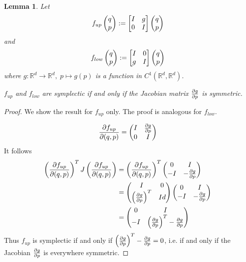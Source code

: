 \documentclass[twoside,a4paper]{article}
\newtheorem{lemma}{Lemma}
\begin{document}


\begin{lemma}\label{jacobi_symmetric}
	Let
	\begin{equation*}
		f_{up} \qpvec := \uppersympop{g}
	\end{equation*}
	and
	\begin{equation*}
		f_{low} \qpvec := \lowersympop{g}
	\end{equation*}
	where $g: \mathbb{R}^d \to \mathbb{R}^d,\; p \mapsto g(p)$ is a function in 
	$C^1(\mathbb{R}^d, \mathbb{R}^d)$. 

	$f_{up}$ and $f_{low}$ are symplectic if and only if the Jacobian matrix $\jac{g}{p}$
	is symmetric.
\end{lemma}
\begin{proof}
	We show the result for $f_{up}$ only. The proof is analogous for $f_{low}$.

	\begin{equation*}
		\deldel[f_{up}]{(q,p)} = \begin{pmatrix}
			I & \deldel[g]{p} \\
			0 & I
		\end{pmatrix}
	\end{equation*}
	It follows
	\begin{align*}
		\jacp{f_{up}}{(q,p)}^T J \jacp{f_{up}}{(q,p)} 
		&= \left(\deldel[f_{up}]{(q,p)}\right)^T \begin{pmatrix}
			0 & I \\
			-I & -\jac{g}{p}
		\end{pmatrix} \\
		&= \begin{pmatrix}
			I & 0 \\
			\jacp{g}{p}^T & Id
		\end{pmatrix} \begin{pmatrix}
			0 & I \\
			-I & -\jac{g}{p}
		\end{pmatrix} \\
		&= \begin{pmatrix}
			0 & I \\
			-I & \jacp{g}{p}^T-\jac{g}{p}
		\end{pmatrix}
	\end{align*}
	Thus $f_{up}$ is symplectic if and only if $\jacp{g}{p}^T-\jac{g}{p}=0$, 
	i.e. if and only if the Jacobian $\deldel[g]{p}$ is everywhere symmetric.
\end{proof}
\end{document}
